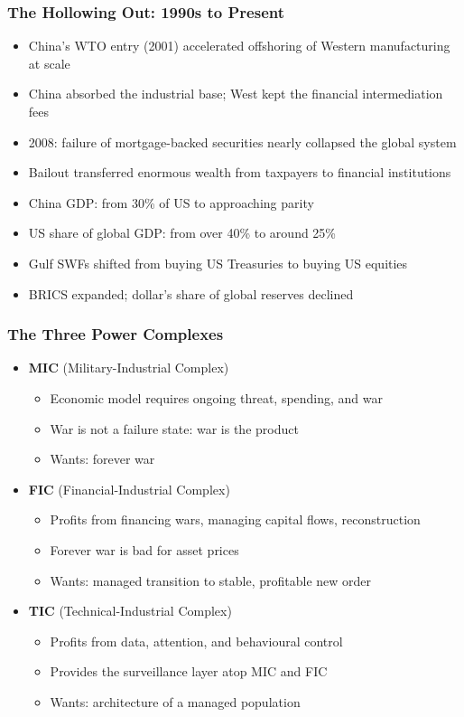 \begin{frame}[fragile]\frametitle{The Hollowing Out: 1990s to Present}
  \begin{itemize}
    \item China's WTO entry (2001) accelerated offshoring of Western manufacturing at scale
    \item China absorbed the industrial base; West kept the financial intermediation fees
    \item 2008: failure of mortgage-backed securities nearly collapsed the global system
    \item Bailout transferred enormous wealth from taxpayers to financial institutions
    \item China GDP: from 30\% of US to approaching parity
    \item US share of global GDP: from over 40\% to around 25\%
    \item Gulf SWFs shifted from buying US Treasuries to buying US equities
    \item BRICS expanded; dollar's share of global reserves declined
  \end{itemize}
\end{frame}

\begin{frame}[fragile]\frametitle{The Three Power Complexes}
  \begin{itemize}
    \item \textbf{MIC} (Military-Industrial Complex)
      \begin{itemize}
        \item Economic model requires ongoing threat, spending, and war
        \item War is not a failure state: war is the product
        \item Wants: forever war
      \end{itemize}
    \item \textbf{FIC} (Financial-Industrial Complex)
      \begin{itemize}
        \item Profits from financing wars, managing capital flows, reconstruction
        \item Forever war is bad for asset prices
        \item Wants: managed transition to stable, profitable new order
      \end{itemize}
    \item \textbf{TIC} (Technical-Industrial Complex)
      \begin{itemize}
        \item Profits from data, attention, and behavioural control
        \item Provides the surveillance layer atop MIC and FIC
        \item Wants: architecture of a managed population
      \end{itemize}
  \end{itemize}
\end{frame}

